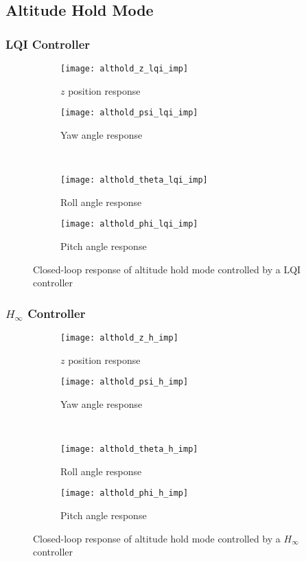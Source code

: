 \subsection{Altitude Hold Mode}

\subsubsection{LQI Controller}

\begin{figure}[H]
\begin{subfigure}{.5\linewidth}
\centering
\texttt{[image: althold\_z\_lqi\_imp]}
\caption{$z$ position response}
\label{fig:althold_z_lqi_imp}
\end{subfigure}%
\begin{subfigure}{.5\linewidth}
\centering
\texttt{[image: althold\_psi\_lqi\_imp]}
\caption{Yaw angle response}
\label{fig:althold_psi_lqi_imp}
\end{subfigure}\\[1ex]
\begin{subfigure}{0.5\linewidth}
\centering
\texttt{[image: althold\_theta\_lqi\_imp]}
\caption{Roll angle response}
\label{fig:althold_theta_lqi_imp}
\end{subfigure}
\begin{subfigure}{0.5\linewidth}
\centering
\texttt{[image: althold\_phi\_lqi\_imp]}
\caption{Pitch angle response}
\label{fig:althold_phi_lqi_imp}
\end{subfigure}
\caption{Closed-loop response of altitude hold mode controlled by a LQI controller}
\label{fig:althold_lqi_imp}
\end{figure}


\subsubsection{$H_\infty$ Controller}

\begin{figure}[H]
\begin{subfigure}{.5\linewidth}
\centering
\texttt{[image: althold\_z\_h\_imp]}
\caption{$z$ position response}
\label{fig:althold_z_h_imp}
\end{subfigure}%
\begin{subfigure}{.5\linewidth}
\centering
\texttt{[image: althold\_psi\_h\_imp]}
\caption{Yaw angle response}
\label{fig:althold_psi_h_imp}
\end{subfigure}\\[1ex]
\begin{subfigure}{0.5\linewidth}
\centering
\texttt{[image: althold\_theta\_h\_imp]}
\caption{Roll angle response}
\label{fig:althold_theta_h_imp}
\end{subfigure}
\begin{subfigure}{0.5\linewidth}
\centering
\texttt{[image: althold\_phi\_h\_imp]}
\caption{Pitch angle response}
\label{fig:althold_phi_h_imp}
\end{subfigure}
\caption{Closed-loop response of altitude hold mode controlled by a $H_\infty$ controller}
\label{fig:althold_h_imp}
\end{figure}



